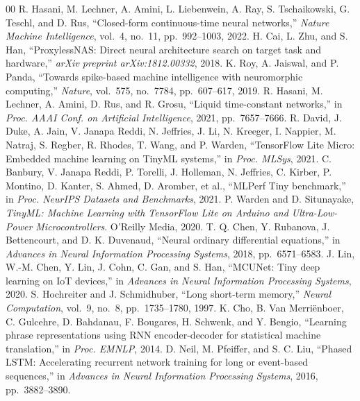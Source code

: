 \documentclass[conference]{IEEEtran}
\begin{document}
\begin{thebibliography}{00}
 R. Hasani, M. Lechner, A. Amini, L. Liebenwein, A. Ray, S. Tschaikowski, G. Teschl, and D. Rus, ``Closed-form continuous-time neural networks,'' \textit{Nature Machine Intelligence}, vol.~4, no.~11, pp.~992--1003, 2022.
 H. Cai, L. Zhu, and S. Han, ``ProxylessNAS: Direct neural architecture search on target task and hardware,'' \textit{arXiv preprint arXiv:1812.00332}, 2018.
 K. Roy, A. Jaiswal, and P. Panda, ``Towards spike-based machine intelligence with neuromorphic computing,'' \textit{Nature}, vol.~575, no.~7784, pp.~607--617, 2019.
 R. Hasani, M. Lechner, A. Amini, D. Rus, and R. Grosu, ``Liquid time-constant networks,'' in \textit{Proc. AAAI Conf. on Artificial Intelligence}, 2021, pp.~7657--7666.
 R. David, J. Duke, A. Jain, V. Janapa Reddi, N. Jeffries, J. Li, N. Kreeger, I. Nappier, M. Natraj, S. Regber, R. Rhodes, T. Wang, and P. Warden, ``TensorFlow Lite Micro: Embedded machine learning on TinyML systems,'' in \textit{Proc. MLSys}, 2021.
 C. Banbury, V. Janapa Reddi, P. Torelli, J. Holleman, N. Jeffries, C. Kirber, P. Montino, D. Kanter, S. Ahmed, D. Aromber, et al., ``MLPerf Tiny benchmark,'' in \textit{Proc. NeurIPS Datasets and Benchmarks}, 2021.
 P. Warden and D. Situnayake, \textit{TinyML: Machine Learning with TensorFlow Lite on Arduino and Ultra-Low-Power Microcontrollers}. O'Reilly Media, 2020.
 T. Q. Chen, Y. Rubanova, J. Bettencourt, and D. K. Duvenaud, ``Neural ordinary differential equations,'' in \textit{Advances in Neural Information Processing Systems}, 2018, pp.~6571--6583.
 J. Lin, W.-M. Chen, Y. Lin, J. Cohn, C. Gan, and S. Han, ``MCUNet: Tiny deep learning on IoT devices,'' in \textit{Advances in Neural Information Processing Systems}, 2020.
 S. Hochreiter and J. Schmidhuber, ``Long short-term memory,'' \textit{Neural Computation}, vol.~9, no.~8, pp.~1735--1780, 1997.
 K. Cho, B. Van Merriënboer, C. Gulcehre, D. Bahdanau, F. Bougares, H. Schwenk, and Y. Bengio, ``Learning phrase representations using RNN encoder-decoder for statistical machine translation,'' in \textit{Proc. EMNLP}, 2014.
 D. Neil, M. Pfeiffer, and S. C. Liu, ``Phased LSTM: Accelerating recurrent network training for long or event-based sequences,'' in \textit{Advances in Neural Information Processing Systems}, 2016, pp.~3882--3890.

\end{thebibliography}
\end{document}
